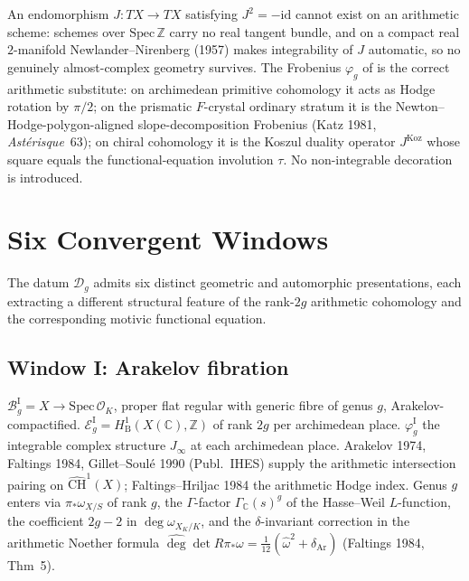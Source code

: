 \begin{remark}
\label{v4-arith:ag:rem:almost-complex}
An endomorphism \(J:TX\to TX\) satisfying \(J^2=-\mathrm{id}\) cannot exist
on an arithmetic scheme: schemes over \(\mathrm{Spec}\,\mathbb{Z}\) carry no
real tangent bundle, and on a compact real \(2\)-manifold
Newlander--Nirenberg (1957) makes integrability of \(J\) automatic, so no
genuinely almost-complex geometry survives.  The Frobenius
\(\varphi_g\) of  is the correct
arithmetic substitute: on archimedean primitive cohomology it acts as
Hodge rotation by \(\pi/2\); on the prismatic \(F\)-crystal ordinary
stratum it is the Newton--Hodge-polygon-aligned slope-decomposition
Frobenius (Katz 1981, \emph{Ast\'erisque}~63); on chiral cohomology it
is the Koszul duality operator \(J^{\mathrm{Koz}}\) whose square equals
the functional-equation involution \(\tau\).  No non-integrable
decoration is introduced.
\end{remark}

\section{Six Convergent Windows}
\label{v4-arith:ag:windows}

The datum \(\mathcal{D}_g\) admits six distinct geometric and automorphic
presentations, each extracting a different structural feature of the
rank-\(2g\) arithmetic cohomology and the corresponding motivic functional
equation.

\subsection{Window I: Arakelov fibration}
\label{v4-arith:ag:w1-arakelov}

\(\mathcal{B}_g^{\mathrm{I}}=X\to\mathrm{Spec}\,\mathcal{O}_K\), proper flat
regular with generic fibre of genus \(g\), Arakelov-compactified.
\(\mathcal{E}_g^{\mathrm{I}}=H^{1}_{\mathrm{B}}(X(\mathbb{C}),\mathbb{Z})\)
of rank \(2g\) per archimedean place. \(\varphi_g^{\mathrm{I}}\) the integrable
complex structure \(J_\infty\) at each archimedean place. Arakelov 1974,
Faltings 1984, Gillet--Soulé 1990 (Publ.~IHES) supply the arithmetic
intersection pairing on \(\widehat{\mathrm{CH}}^1(X)\); Faltings--Hriljac
1984 the arithmetic Hodge index. Genus \(g\) enters via \(\pi_*\omega_{X/S}\)
of rank \(g\), the \(\Gamma\)-factor \(\Gamma_{\mathbb{C}}(s)^g\) of the
Hasse--Weil \(L\)-function, the coefficient \(2g-2\) in \(\deg\omega_{X_K/K}\),
and the \(\delta\)-invariant correction in the arithmetic Noether formula
\(\widehat{\deg}\det R\pi_*\omega=\tfrac{1}{12}(\widehat{\omega}^2+\delta_{\mathrm{Ar}})\)
(Faltings 1984, Thm~5).

